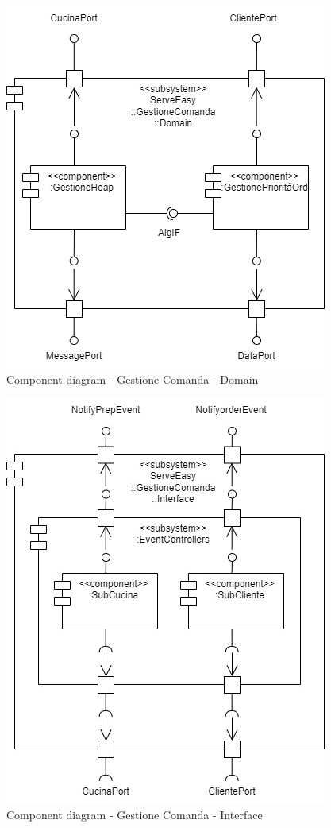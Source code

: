 \begin{figure}[htbp]
	\centering
	\includegraphics[scale=0.5]{iterazione1/images/component_comanda_cucina-GestioneComanda__Domain.jpg}
	\caption{Component diagram - Gestione Comanda - Domain \label{fig:component_diagram_gestione_comanda_domain}}
\end{figure}

\begin{figure}[htbp]
	\centering
	\includegraphics[scale=0.5]{iterazione1/images/component_comanda_cucina-GestioneComanda__Interface.jpg}
	\caption{Component diagram - Gestione Comanda - Interface \label{fig:component_diagram_gestione_comanda_interface}}
\end{figure}

